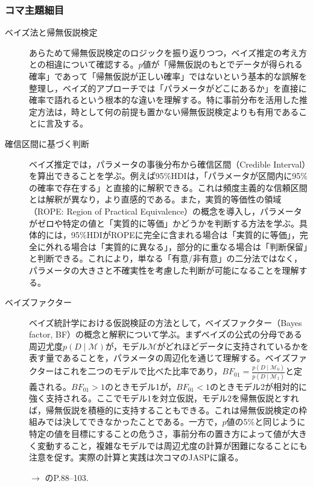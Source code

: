 \subsubsection{コマ主題細目}
\begin{description}
	\item[ベイズ法と帰無仮説検定] あらためて帰無仮説検定のロジックを振り返りつつ，ベイズ推定の考え方との相違について確認する。$p$値が「帰無仮説のもとでデータが得られる確率」であって「帰無仮説が正しい確率」ではないという基本的な誤解を整理し，ベイズ的アプローチでは「パラメータがどこにあるか」を直接に確率で語れるという根本的な違いを理解する。特に事前分布を活用した推定方法は，時として何の前提も置かない帰無仮説検定よりも有用であることに言及する。

	\item[確信区間に基づく判断] ベイズ推定では，パラメータの事後分布から確信区間（Credible Interval）を算出できることを学ぶ。例えば95\%HDIは，「パラメータが区間内に95\%の確率で存在する」と直接的に解釈できる。これは頻度主義的な信頼区間とは解釈が異なり，より直感的である。また，実質的等価性の領域（ROPE: Region of Practical Equivalence）の概念を導入し，パラメータがゼロや特定の値と「実質的に等価」かどうかを判断する方法を学ぶ。具体的には，95\%HDIがROPEに完全に含まれる場合は「実質的に等価」，完全に外れる場合は「実質的に異なる」，部分的に重なる場合は「判断保留」と判断できる。これにより，単なる「有意/非有意」の二分法ではなく，パラメータの大きさと不確実性を考慮した判断が可能になることを理解する。 

	\item[ベイズファクター] ベイズ統計学における仮説検証の方法として，ベイズファクター（Bayes factor, BF）の概念と解釈について学ぶ。まずベイズの公式の分母である周辺尤度$p(D \mid \mathcal{M})$が，モデル$\mathcal{M}$がどれほどデータに支持されているかを表す量であることを，パラメータの周辺化を通じて理解する。ベイズファクターはこれを二つのモデルで比べた比率であり，$BF_{01} = \frac{p(D \mid \mathcal{M}_0)}{p(D \mid \mathcal{M}_1)}$と定義される。$BF_{01} > 1$のときモデル1が，$BF_{01} < 1$のときモデル2が相対的に強く支持される。ここでモデル1を対立仮説，モデル2を帰無仮説とすれば，帰無仮説を積極的に支持することもできる。これは帰無仮説検定の枠組みでは決してできなかったことである。一方で，$p$値の5\%と同じように特定の値を目標にすることの危うさ，事前分布の置き方によって値が大きく変動すること，複雑なモデルでは周辺尤度の計算が困難になることにも注意を促す。実際の計算と実践は次コマのJASPに譲る。
	      \begin{flushright}
		      $\to$ \textcite{Lee201709}のP.88--103.
	      \end{flushright}


\end{description}
